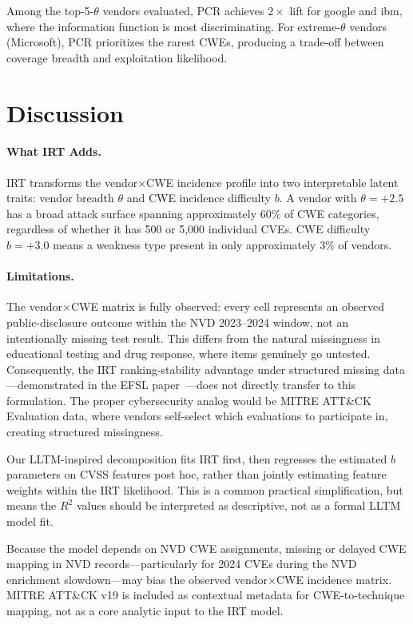 \documentclass[11pt,a4paper]{article}
\begin{document}
Among the top-5-$\theta$ vendors evaluated, PCR achieves $2\times$ lift for google and ibm, where the information function is most discriminating.
For extreme-$\theta$ vendors (Microsoft), PCR prioritizes the rarest CWEs, producing a trade-off between coverage breadth and exploitation likelihood.

\section{Discussion}

\paragraph{What IRT Adds.}
IRT transforms the vendor$\times$CWE incidence profile into two interpretable latent traits: vendor breadth $\theta$ and CWE incidence difficulty $b$.
A vendor with $\theta = +2.5$ has a broad attack surface spanning approximately 60\% of CWE categories, regardless of whether it has 500 or 5,000 individual CVEs.
CWE difficulty $b = +3.0$ means a weakness type present in only approximately 3\% of vendors.

\paragraph{Limitations.}
The vendor$\times$CWE matrix is fully observed: every cell represents an observed public-disclosure outcome within the NVD 2023--2024 window, not an intentionally missing test result.
This differs from the natural missingness in educational testing and drug response, where items genuinely go untested.
Consequently, the IRT ranking-stability advantage under structured missing data---demonstrated in the EFSL paper~\citep{kang2026efsl}---does not directly transfer to this formulation.
The proper cybersecurity analog would be MITRE ATT\&CK Evaluation data, where vendors self-select which evaluations to participate in, creating structured missingness.

Our LLTM-inspired decomposition fits IRT first, then regresses the estimated $b$ parameters on CVSS features post hoc, rather than jointly estimating feature weights within the IRT likelihood.
This is a common practical simplification, but means the $R^2$ values should be interpreted as descriptive, not as a formal LLTM model fit.

Because the model depends on NVD CWE assignments, missing or delayed CWE mapping in NVD records---particularly for 2024 CVEs during the NVD enrichment slowdown---may bias the observed vendor$\times$CWE incidence matrix.
MITRE ATT\&CK v19 is included as contextual metadata for CWE-to-technique mapping, not as a core analytic input to the IRT model.
\end{document}

